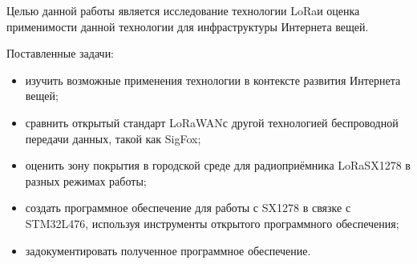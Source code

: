 Целью данной работы является исследование технологии LoRa\texttrademark и 
оценка применимости 
данной технологии для инфраструктуры Интернета вещей.

Поставленные задачи:
\begin{itemize}
	\item изучить возможные применения технологии в контексте развития 
Интернета вещей;
	\item сравнить открытый стандарт LoRaWAN\texttrademark с другой 
технологией
беспроводной передачи данных, такой как SigFox;
	\item оценить зону покрытия в городской среде для 
радиоприёмника LoRa\texttrademark SX1278 в разных режимах работы;
	\item создать программное обеспечение для работы с SX1278 в связке с
STM32L476, используя инструменты открытого программного обеспечения;
	\item задокументировать полученное программное обеспечение.
\end{itemize}



